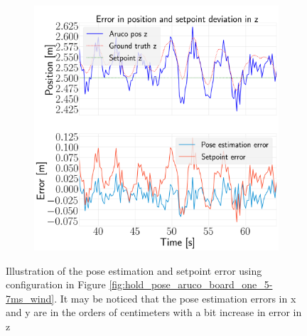 \documentclass[../Head/report.tex]{subfiles}
\begin{document}
\begin{figure}[H]
\begin{subfigure}[t]{.30\textwidth}
        \caption{}
        \label{fig:hold_pose_estimation_test2_y}
    \end{subfigure}
     \hspace{0.2em}
    \begin{subfigure}[t]{.30\textwidth}
        \centering
        \includegraphics[width=\textwidth]{../Figures/hold_pose_using_aruco_pose_estimation/pose_error_z_test2.png}
        \caption{}
        \label{fig:hold_pose_estimation_test2_z}
    \end{subfigure}
    \caption{Illustration of the pose estimation and setpoint error using configuration in Figure \ref{fig:hold_pose_aruco_board_one_5-7ms_wind}. It may be noticed that the pose estimation errors in x and y are in the orders of centimeters with a bit increase in error in z}
    \label{fig:hold_pose_estimation_test2_error_pos}
\end{figure}
\end{document}
